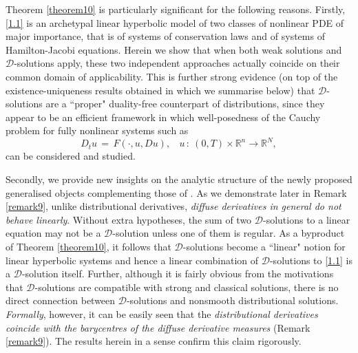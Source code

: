 \documentclass{amsart}
\theoremstyle{definition}
\numberwithin{equation}{section}
\begin{document}
 Theorem \ref{theorem10} is particularly significant for the following reasons. Firstly, 
 \eqref{1.1} is an archetypal linear hyperbolic model of two classes of nonlinear PDE of major importance, that is of systems of conservation laws and of systems of Hamilton-Jacobi equations. Herein we show that when both weak solutions and ${\mathcal{D}}$-solutions apply, these two independent approaches actually coincide on their common domain of applicability. This is further strong evidence (on top of the existence-uniqueness results obtained in \cite{K8,K9} which we summarise below) that ${\mathcal{D}}$-solutions are a ``proper" duality-free counterpart of distributions, since they appear to be an efficient framework in which well-posedness of the Cauchy problem for fully nonlinear systems such as
\[
D_tu\, =\, F(\cdot,u,Du), \ \ \ \ u\, :\ (0,T){\times}{\mathbb{R}}^n{\longrightarrow} {\mathbb{R}}^N,
\]
can be considered and studied. 

Secondly, we provide new insights on the analytic structure of the newly proposed generalised objects complementing those of \cite{K8}. As we demonstrate later in Remark \ref{remark9}, unlike distributional derivatives, \emph{diffuse derivatives in general do not behave linearly}.  Without extra hypotheses, the sum of two ${\mathcal{D}}$-solutions to a linear equation may not be a ${\mathcal{D}}$-solution unless one of them is regular. As a byproduct of Theorem \ref{theorem10}, it follows that ${\mathcal{D}}$-solutions become a ``linear" notion for linear hyperbolic systems and hence a linear combination of ${\mathcal{D}}$-solutions to \eqref{1.1} is a ${\mathcal{D}}$-solution itself. Further, 
although it is fairly obvious from the motivations that ${\mathcal{D}}$-solutions are compatible with strong and classical solutions, there is no direct connection between ${\mathcal{D}}$-solutions and nonsmooth distributional solutions. \emph{Formally}, however, it can be easily seen that the \emph{distributional derivatives coincide with the barycentres of the diffuse derivative measures} (Remark \ref{remark9}). The results herein in a sense confirm this claim rigorously.
\end{document}
